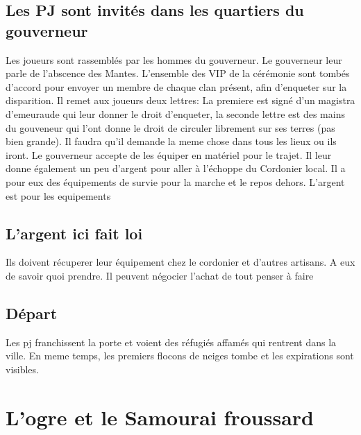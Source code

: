 \documentclass[oneside,12pt]{book}
\begin{document}
\begin{flushleft}
\subsection{Les PJ sont invités dans les quartiers du gouverneur}
Les joueurs sont rassemblés par les hommes du gouverneur. Le gouverneur leur parle de l'abscence des Mantes. L'ensemble des VIP de la cérémonie sont tombés d'accord pour envoyer un membre de chaque clan présent, afin d'enqueter sur la disparition. 
Il remet aux joueurs deux lettres: La premiere est signé d'un magistra d'emeuraude qui leur donner le droit d'enqueter, la seconde lettre est des mains du gouveneur qui l'ont donne le droit de circuler librement sur ses terres (pas bien grande). 
Il faudra qu'il demande la meme chose dans tous les lieux ou ils iront. Le gouverneur accepte de les équiper en matériel pour le trajet. 
Il leur donne également un peu d'argent pour aller à l'échoppe du Cordonier local. 
Il a pour eux des équipements de survie pour la marche et le repos dehors. L'argent est pour les equipements 

\subsection{L'argent ici fait loi}
Ils doivent récuperer leur équipement chez le cordonier et d'autres artisans. A eux de savoir quoi prendre. Il peuvent négocier l'achat de tout penser à faire 

\subsection{Départ}
Les pj franchissent la porte et voient des réfugiés affamés qui rentrent dans la ville. 
En meme temps, les premiers flocons de neiges tombe et les expirations sont visibles.


\section{L'ogre et le Samourai froussard}



\end{flushleft}
\end{document}
